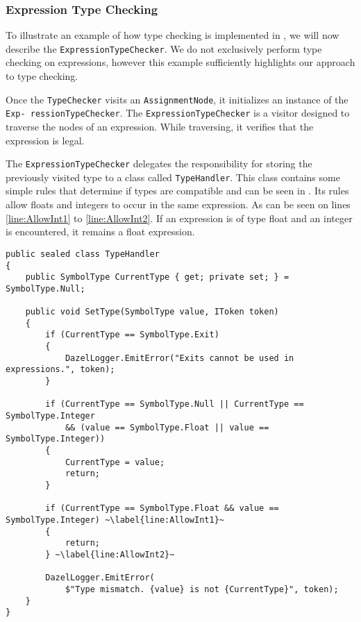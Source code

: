 \subsubsection*{Expression Type Checking} \label{sec:ExpressionTypeChecking}
To illustrate an example of how type checking is implemented in \dazel{}, we will now describe the \texttt{ExpressionTypeChecker}.
We do not exclusively perform type checking on expressions, however this example sufficiently highlights our approach to type checking.


Once the \texttt{TypeChecker} visits an \texttt{AssignmentNode}, it initializes an instance of the \texttt{Exp-
ressionTypeChecker}. The \texttt{ExpressionTypeChecker} is a visitor designed to traverse the nodes of an expression. While traversing, it verifies that the expression is legal.

The \texttt{ExpressionTypeChecker} delegates the responsibility for storing the previously visited type to a class called \texttt{TypeHandler}. This class contains some simple rules that determine if types are compatible and can be seen in . 
Its rules allow floats and integers to occur in the same expression. As can be seen on lines \ref{line:AllowInt1} to \ref{line:AllowInt2}. If an expression is of type float and an integer is encountered, it remains a float expression.

\begin{lstlisting}[language=CSharp, caption={The \texttt{TypeHandler} class.}, label={lst:TypeHandler},escapechar=~]
public sealed class TypeHandler
{
    public SymbolType CurrentType { get; private set; } = SymbolType.Null;

    public void SetType(SymbolType value, IToken token)
    {
        if (CurrentType == SymbolType.Exit)
        {
            DazelLogger.EmitError("Exits cannot be used in expressions.", token);
        }
            
        if (CurrentType == SymbolType.Null || CurrentType == SymbolType.Integer 
            && (value == SymbolType.Float || value == SymbolType.Integer))
        {
            CurrentType = value;
            return;
        }
            
        if (CurrentType == SymbolType.Float && value == SymbolType.Integer) ~\label{line:AllowInt1}~
        {
            return;
        } ~\label{line:AllowInt2}~
            
        DazelLogger.EmitError(
            $"Type mismatch. {value} is not {CurrentType}", token);
    }
}
\end{lstlisting}

